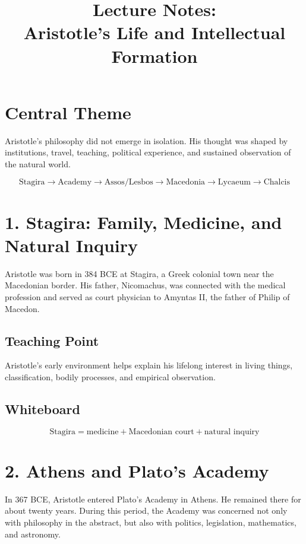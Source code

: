 \documentclass[12pt]{article}
\title{Lecture Notes: \\Aristotle's Life and Intellectual Formation}
\author{}
\date{}
\begin{document}
\maketitle

\section*{Central Theme}

Aristotle's philosophy did not emerge in isolation. His thought was shaped by
institutions, travel, teaching, political experience, and sustained observation
of the natural world.

\[
\text{Stagira} \rightarrow \text{Academy} \rightarrow \text{Assos/Lesbos}
\rightarrow \text{Macedonia} \rightarrow \text{Lycaeum} \rightarrow \text{Chalcis}
\]

\section*{1. Stagira: Family, Medicine, and Natural Inquiry}

Aristotle was born in 384 BCE at Stagira, a Greek colonial town near the
Macedonian border. His father, Nicomachus, was connected with the medical
profession and served as court physician to Amyntas II, the father of Philip of
Macedon.

\subsection*{Teaching Point}

Aristotle's early environment helps explain his lifelong interest in living
things, classification, bodily processes, and empirical observation.

\subsection*{Whiteboard}

\[
\text{Stagira} = \text{medicine} + \text{Macedonian court} + \text{natural inquiry}
\]

\section*{2. Athens and Plato's Academy}

In 367 BCE, Aristotle entered Plato's Academy in Athens. He remained there for
about twenty years. During this period, the Academy was concerned not only with
philosophy in the abstract, but also with politics, legislation, mathematics,
and astronomy.
\end{document}
